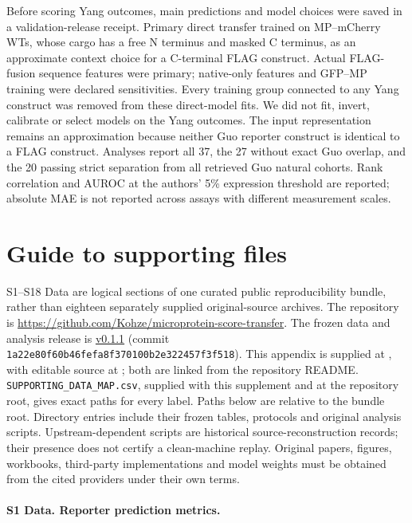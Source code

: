 \documentclass[11pt,a4paper]{article}
\begin{document}
Before scoring Yang outcomes, main predictions and model choices were saved
in a validation-release receipt. Primary direct transfer trained on MP--mCherry
WTs, whose cargo has a free N terminus and masked C terminus, as an approximate
context choice for a C-terminal FLAG construct. Actual FLAG-fusion sequence
features were primary; native-only features and GFP--MP training were declared
sensitivities. Every training group connected to any Yang construct was removed
from these direct-model fits. We did not fit, invert, calibrate or select models
on the Yang outcomes. The input representation remains an approximation because neither Guo reporter construct is identical to a FLAG construct. Analyses report all
37, the 27 without exact Guo overlap, and the 20 passing strict separation from
all retrieved Guo natural cohorts. Rank correlation and AUROC at the authors'
5\% expression threshold are reported; absolute MAE is not reported across assays with different measurement scales.


\section{Guide to supporting files}
S1--S18 Data are logical sections of one curated public reproducibility
bundle, rather than eighteen separately supplied original-source archives.
The repository is \url{https://github.com/Kohze/microprotein-score-transfer}.
The frozen data and analysis release is
\href{https://github.com/Kohze/microprotein-score-transfer/releases/tag/v0.1.1}{v0.1.1}
(commit \texttt{1a22e80f60b46fefa8f370100b2e322457f3f518}).
This appendix is supplied at , with editable source
at ; both are linked from the repository README.
\texttt{SUPPORTING\_DATA\_MAP.csv}, supplied with this supplement and at the
repository root, gives exact paths for every label. Paths below are
relative to the bundle root. Directory entries include their frozen
tables, protocols and original analysis scripts. Upstream-dependent
scripts are historical source-reconstruction records; their presence does
not certify a clean-machine replay. Original papers, figures, workbooks,
third-party implementations and model weights must be obtained from the
cited providers under their own terms.


\paragraph{S1 Data. Reporter prediction metrics.}
\end{document}
